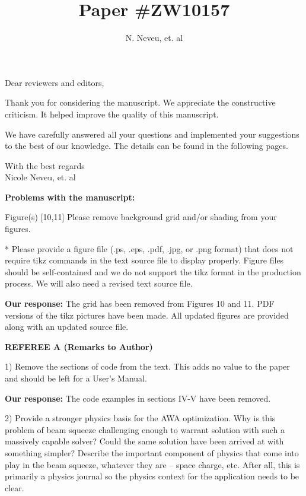 \documentclass{article}
\begin{document}
\title {Paper  \#ZW10157}
\author {N. Neveu, et. al}

\maketitle
Dear reviewers and editors,

Thank you for considering the manuscript.
We appreciate the constructive criticism. 
It helped improve the quality of this manuscript.

We have carefully answered all your questions and implemented your suggestions to the best of our knowledge.
The details can be found in the following pages.

With the best regards  \\[3mm]
 
Nicole Neveu, et. al

\pagebreak

{\bf Problems with the manuscript:}

{ Figure(s) [10,11] 
	Please remove background grid and/or shading from your figures.

* Please provide a figure file (.ps, .eps, .pdf, .jpg, or .png format)
that does not require tikz commands in the text source file to
display properly. Figure files should be self-contained and we do
not support the tikz format in the production process. We will also
need a revised text source file.}

{\bf Our response:} {\color{blue} The grid has been removed from Figures 10 and 11.
PDF versions of the tikz pictures have been made. All updated figures are provided 
along with an updated source file.}


{\bf REFEREE A (Remarks to Author)}

1) Remove the sections of code from the text. This adds no value to
	the paper and should be left for a User’s Manual.

{\bf Our response:} {\color{blue} The code examples in sections IV-V have been removed.}


2) Provide a stronger physics basis for the AWA optimization. Why is
this problem of beam squeeze challenging enough to warrant solution
with such a massively capable solver? Could the same solution have
been arrived at with something simpler? Describe the important
component of physics that come into play in the beam squeeze, whatever
they are – space charge, etc. After all, this is primarily a physics
journal so the physics context for the application needs to be clear.
\end{document}
